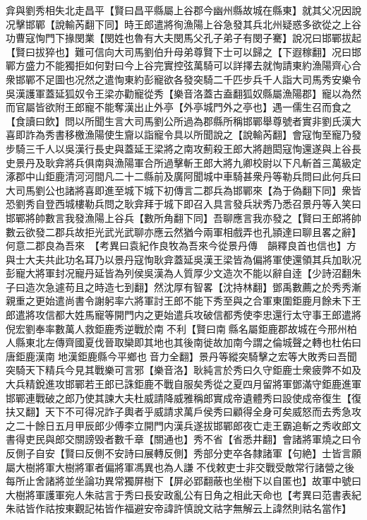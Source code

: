 弇與劉秀相失北走昌平【賢曰昌平縣屬上谷郡今幽州縣故城在縣東】就其父况因說况擊邯鄲【說輸芮翻下同】時王郎遣將徇漁陽上谷急發其兵北州疑惑多欲從之上谷功曹寇恂門下掾閔業【閔姓也魯有大夫閔馬父孔子弟子有閔子騫】說况曰邯鄲拔起【賢曰拔猝也】難可信向大司馬劉伯升母弟尊賢下士可以歸之【下遐稼翻】况曰邯鄲方盛力不能獨拒如何對曰今上谷完實控弦萬騎可以詳擇去就恂請東約漁陽齊心合衆邯鄲不足圖也况然之遣恂東約彭寵欲各發突騎二千匹步兵千人詣大司馬秀安樂令吳漢護軍蓋延狐奴令王梁亦勸寵從秀【樂音洛蓋古盍翻狐奴縣屬漁陽郡】寵以為然而官屬皆欲附王郎寵不能奪漢出止外亭【外亭城門外之亭也】遇一儒生召而食之【食讀曰飲】問以所聞生言大司馬劉公所過為郡縣所稱邯鄲舉尊號者實非劉氏漢大喜即詐為秀書移檄漁陽使生齎以詣寵令具以所聞說之【說輸芮翻】會寇恂至寵乃發步騎三千人以吳漢行長史與蓋延王梁將之南攻薊殺王郎大將趙閎寇恂還遂與上谷長史景丹及耿弇將兵俱南與漁陽軍合所過擊斬王郎大將九卿校尉以下凡斬首三萬級定涿郡中山鉅鹿清河河間凡二十二縣前及廣阿聞城中車騎甚衆丹等勒兵問曰此何兵曰大司馬劉公也諸將喜即進至城下城下初傳言二郡兵為邯鄲來【為于偽翻下同】衆皆恐劉秀自登西城樓勒兵問之耿弇拜于城下即召入具言發兵狀秀乃悉召景丹等入笑曰邯鄲將帥數言我發漁陽上谷兵【數所角翻下同】吾聊應言我亦發之【賢曰王郎將帥數云欲發二郡兵故拒光武光武聊亦應云然猶今兩軍相戲弄也孔頴達曰聊且畧之辭】何意二郡良為吾來　【考異曰袁紀作良牧為吾來今從景丹傳　韻釋良首也信也】方與士大夫共此功名耳乃以景丹寇恂耿弇蓋延吳漢王梁皆為偏將軍使還領其兵加耿况彭寵大將軍封况寵丹延皆為列侯吳漢為人質厚少文造次不能以辭自逹【少詩沼翻朱子曰造次急遽苟且之時造七到翻】然沈厚有智畧【沈持林翻】鄧禹數薦之於秀秀漸親重之更始遣尚書令謝躬率六將軍討王郎不能下秀至與之合軍東圍鉅鹿月餘未下王郎遣將攻信都大姓馬寵等開門内之更始遣兵攻破信都秀使李忠還行太守事王郎遣將倪宏劉奉率數萬人救鉅鹿秀逆戰於南不利【賢曰南縣名屬鉅鹿郡故城在今邢州柏人縣東北左傳齊國夏伐晉取欒即其地也其後南徙故加南今謂之倫城聲之轉也杜佑曰唐鉅鹿漢南地漢鉅鹿縣今平鄉也音力全翻】景丹等縱突騎擊之宏等大敗秀曰吾聞突騎天下精兵今見其戰樂可言邪【樂音洛】耿純言於秀曰久守鉅鹿士衆疲弊不如及大兵精銳進攻邯鄲若王郎已誅鉅鹿不戰自服矣秀從之夏四月留將軍鄧滿守鉅鹿進軍邯鄲連戰破之郎乃使其諫大夫杜威請降威雅稱郎實成帝遺體秀曰設使成帝復生【復扶又翻】天下不可得况詐子輿者乎威請求萬戶侯秀曰顧得全身可矣威怒而去秀急攻之二十餘日五月甲辰郎少傅李立開門内漢兵遂拔邯鄲郎夜亡走王霸追斬之秀收郎文書得吏民與郎交關謗毁者數千章【關通也】秀不省【省悉井翻】會諸將軍燒之曰令反側子自安【賢曰反側不安詩曰展轉反側】秀部分吏卒各隸諸軍【句絶】士皆言願屬大樹將軍大樹將軍者偏將軍馮異也為人謙不伐敕吏士非交戰受敵常行諸營之後每所止舍諸將並坐論功異常獨屏樹下【屏必郢翻蔽也坐樹下以自匿也】故軍中號曰大樹將軍護軍宛人朱祜言于秀曰長安政亂公有日角之相此天命也【考異曰范書表紀朱祜皆作祜按東觀記祐皆作福避安帝諱許慎說文祜字無解云上諱然則祜名當作】


